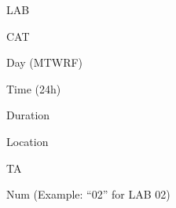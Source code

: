 \begin{itemize*}
\begin{itemize*}
\begin{itemize*}
\begin{itemize*}
			\end{itemize*}
			\item LAB
			\begin{itemize*}
				\item CAT
				\item Day (MTWRF)
				\item Time (24h)
				\item Duration
				\item Location
				\item TA
				\item Num (Example: ``02'' for LAB 02)
			\end{itemize*}
		\end{itemize*}
	\end{itemize*}
\end{itemize*}


